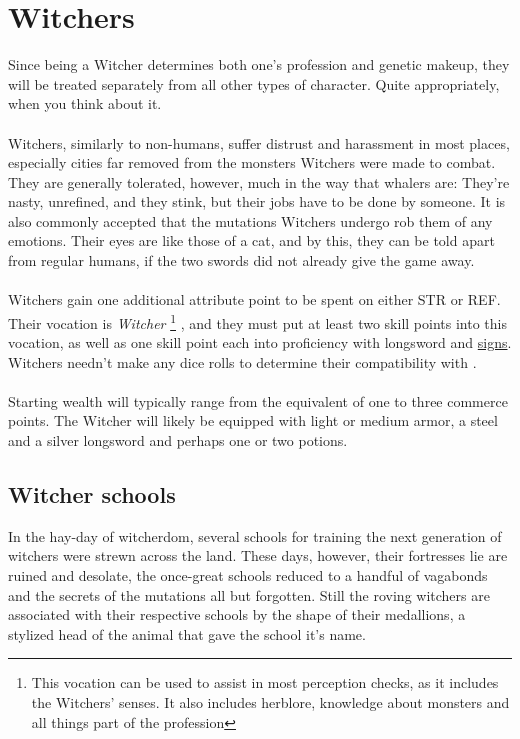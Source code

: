 \documentclass[parskip=full,11pt,%
footheight=38pt]{scrreport}
\begin{document}
\section{Witchers}
Since being a Witcher determines both one's profession and genetic makeup, they will be treated separately from all other types of character. Quite appropriately,
when you think about it.
\\\\
Witchers, similarly to non-humans, suffer distrust and harassment in most places, especially cities far removed from the monsters Witchers were
made to combat. They are generally tolerated, however, much in the way that whalers are: They're nasty, unrefined, and they stink, but their
jobs have to be done by someone. It is also commonly accepted that the mutations Witchers undergo rob them of any emotions. Their eyes are like
those of a cat, and by this, they can be told apart from regular humans, if the two swords did not already give the game away.
\\\\
Witchers gain one additional attribute point to be spent on either STR or REF. Their vocation is \textit{Witcher}%
\footnote{This vocation can be used to assist in most perception checks, as it includes the Witchers' senses.
	It also includes herblore, knowledge about monsters and all things part of the profession}
, and they must put at least two skill points into this vocation, as well as one skill point each into proficiency with longsword
and \hyperref[rule:signs]{signs}. Witchers needn't make any dice rolls to determine their compatibility with .
\\\\
Starting wealth will typically range from the equivalent of one to three commerce points. The Witcher will likely be equipped with light or medium armor, a steel and a silver
longsword and perhaps one or two potions.

\subsection{Witcher schools}
In the hay-day of witcherdom, several schools for training the next generation of witchers were strewn across the land.
These days, however, their fortresses lie are ruined and desolate, the once-great schools reduced to a handful of vagabonds
and the secrets of the mutations all but forgotten. Still the roving witchers are associated with their respective schools
by the shape of their medallions, a stylized head of the animal that gave the school it's name.
\end{document}
